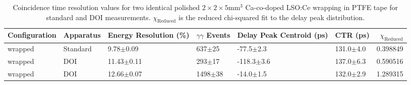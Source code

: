 \begin{table}
\caption{\label{tab:referencevals} Coincidence time resolution values for two identical polished $2\times2\times5$mm$^3$ Ca-co-doped LSO:Ce wrapping in PTFE tape for standard and DOI measurements. $\chi_\text{Reduced}$ is the reduced chi-squared fit to the delay peak distribution.}
\begin{tabular}{llllllr}
Configuration &  Apparatus & Energy Resolution (\%) & $\gamma\gamma$ Events & Delay Peak Centroid (ps) & CTR (ps) &  $\chi_\text{Reduced}$ \\
\hline
      wrapped &  Standard &    9.78$\pm$0.09 &   637$\pm$25 &   -77.5$\pm$2.3 &  131.0$\pm$4.0 &    0.398849 \\
      wrapped &       DOI &   11.43$\pm$0.11 &   293$\pm$17 &  -118.3$\pm$3.6 &  137.0$\pm$6.3 &    0.590516 \\
      wrapped &       DOI &   12.66$\pm$0.07 &  1498$\pm$38 &   -14.0$\pm$1.5 &  132.0$\pm$2.9 &    1.289315 \\
\hline
\end{tabular}
\end{table}